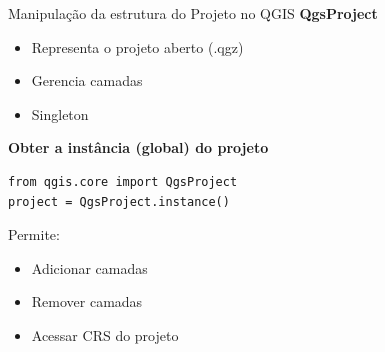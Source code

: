 \documentclass{beamer}
\begin{document}
\begin{frame}[fragile]{Manipulação da estrutura do Projeto no QGIS}
    \textbf{QgsProject}
    
    \begin{itemize}
        \item Representa o projeto aberto (.qgz)
        \item Gerencia camadas
        \item Singleton
    \end{itemize}
    
    \vspace{0.4cm}
    
    \textbf{Obter a instância (global) do projeto}
    
    \begin{verbatim}
from qgis.core import QgsProject
project = QgsProject.instance()
    \end{verbatim}
    
    \vspace{0.3cm}
    
    Permite:
    \begin{itemize}
        \item Adicionar camadas
        \item Remover camadas
        \item Acessar CRS do projeto
    \end{itemize}
\end{frame}
\end{document}
